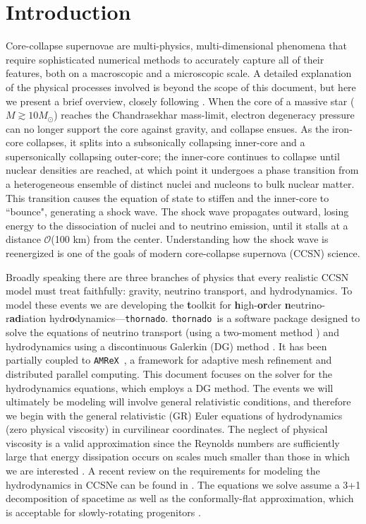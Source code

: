 \documentclass[letterpaper]{jpconf}
\newcommand{\thornado}{\texttt{thornado}}
\newcommand{\amrex}{\texttt{AMReX}}
\newcommand{\mc}[1]{\mathcal{#1}}
\begin{document}
\section{Introduction}
Core-collapse supernovae are multi-physics, multi-dimensional phenomena that require sophisticated numerical methods to accurately capture all of their features, both on a macroscopic and a microscopic scale. A detailed explanation of the physical processes involved is beyond the scope of this document, but here we present a brief overview, closely following \cite{Mezzacappa2005}. When the core of a massive star ($M\gtrsim10 M_{\odot}$) reaches the Chandrasekhar mass-limit, electron degeneracy pressure can no longer support the core against gravity, and collapse ensues. As the iron-core collapses, it splits into a subsonically collapsing inner-core and a supersonically collapsing outer-core; the inner-core continues to collapse until nuclear densities are reached, at which point it undergoes a phase transition from a heterogeneous ensemble of distinct nuclei and nucleons to bulk nuclear matter. This transition causes the equation of state to stiffen and the inner-core to ``bounce", generating a shock wave. The shock wave propagates outward, losing energy to the dissociation of nuclei and to neutrino emission, until it stalls at a distance $\mc{O}$(100 km) from the center. Understanding how the shock wave is reenergized is one of the goals of modern core-collapse supernova (CCSN) science.

Broadly speaking there are three branches of physics that every realistic CCSN model must treat faithfully: gravity, neutrino transport, and hydrodynamics. To model these events we are developing the \textbf{t}oolkit for \textbf{h}igh-\textbf{or}der \textbf{n}eutrino-r\textbf{ad}iation hydr\textbf{o}dynamics---\thornado. \thornado\ is a software package designed to solve the equations of neutrino transport (using a two-moment method \cite{Cardall2013,Shibata2011}) and hydrodynamics using a discontinuous Galerkin (DG) method \cite{CockburnShu1998,HesthavenWarburtonNodalDGMethods}. It has been partially coupled to \amrex\ \cite{AMReX}, a framework for adaptive mesh refinement and distributed parallel computing. This document focuses on the solver for the hydrodynamics equations, which employs a DG method. The events we will ultimately be modeling will involve general relativistic conditions, and therefore we begin with the general relativistic (GR) Euler equations of hydrodynamics (zero physical viscosity) in curvilinear coordinates. The neglect of physical viscosity is a valid approximation since the Reynolds numbers are sufficiently large that energy dissipation occurs on scales much smaller than those in which we are interested \cite{ThompsonDuncan1993}. A recent review on the requirements for modeling the hydrodynamics in CCSNe can be found in \cite{Muller2016}. The equations we solve assume a 3+1 decomposition of spacetime as well as the conformally-flat approximation, which is acceptable for slowly-rotating progenitors \cite{Dimmelmeier2002}.
\end{document}

